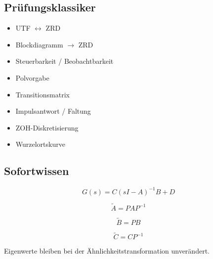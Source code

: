 \subsection*{Prüfungsklassiker}
\begin{itemize}
\item UTF $\leftrightarrow$ ZRD
\item Blockdiagramm $\rightarrow$ ZRD
\item Steuerbarkeit / Beobachtbarkeit
\item Polvorgabe
\item Transitionsmatrix
\item Impulsantwort / Faltung
\item ZOH-Diskretisierung
\item Wurzelortskurve
\end{itemize}

\subsection*{Sofortwissen}

\[
G(s)=C(sI-A)^{-1}B+D
\]

\[
\tilde A=PAP^{-1}
\]

\[
\tilde B=PB
\]

\[
\tilde C=CP^{-1}
\]

Eigenwerte bleiben bei der Ähnlichkeitstransformation unverändert.